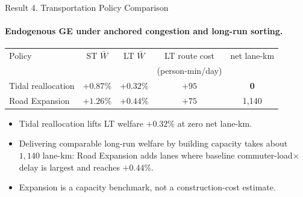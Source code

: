 \documentclass[11pt,aspectratio=169]{beamer}
\newcommand{\good}[1]{\textcolor{blue!70!black}{#1}}
\newcommand{\app}[1]{\allowbreak\hspace{0.25em}\hyperlink{#1}{\beamergotobutton{details}}}
\begin{document}
\begin{frame}[label=result4]{Result 4. Transportation Policy Comparison}
\framesubtitle{Endogenous GE under anchored congestion and long-run sorting.}
\begin{center}\scriptsize
\begin{tabular}{lcccc}
\toprule
Policy & ST $\bar W$ & LT $\bar W$ & LT route cost & net lane-km \\
 &  &  & (person-min/day) &  \\
\midrule
Tidal reallocation & $+0.87\%$ & $+0.32\%$ & $+95$ & \good{\textbf{0}} \\
Road Expansion & $+1.26\%$ & $+0.44\%$ & $+75$ & 1{,}140 \\
\bottomrule
\end{tabular}
\end{center}
\vspace{0.3em}
\begin{itemize}\footnotesize
  \item Tidal reallocation lifts LT welfare $+0.32\%$ at zero net lane-km.
  \item Delivering comparable long-run welfare by building capacity takes about $1{,}140$ lane-km: Road Expansion adds lanes where baseline commuter-load$\times$delay is largest and reaches $+0.44\%$.
  \item Expansion is a capacity benchmark, not a construction-cost estimate. \app{apppolicy}
\end{itemize}
\end{frame}
\end{document}
